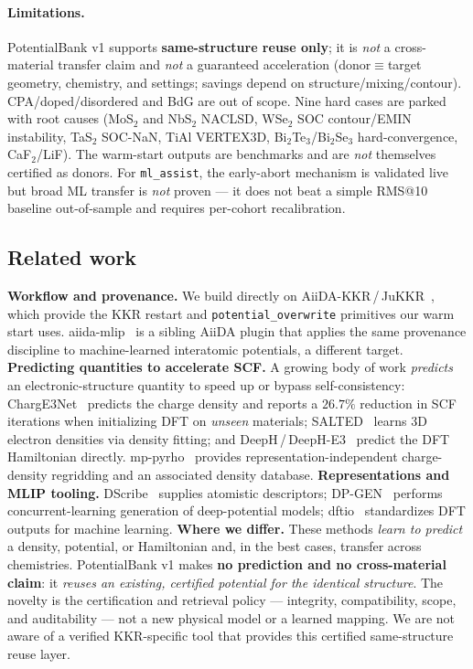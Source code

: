 \documentclass[11pt]{article}
\newcommand{\code}[1]{\texttt{#1}}
\begin{document}
\paragraph{Limitations.} PotentialBank v1 supports \textbf{same-structure reuse only}; it is \emph{not} a
cross-material transfer claim and \emph{not} a guaranteed acceleration (donor$\equiv$target geometry,
chemistry, and settings; savings depend on structure/mixing/contour). CPA/doped/disordered and BdG are out of
scope. Nine hard cases are parked with root causes (MoS$_2$ and NbS$_2$ NACLSD, WSe$_2$ SOC contour/EMIN
instability, TaS$_2$ SOC-NaN, TiAl VERTEX3D, Bi$_2$Te$_3$/Bi$_2$Se$_3$ hard-convergence, CaF$_2$/LiF). The
warm-start outputs are benchmarks and are \emph{not} themselves certified as donors. For \code{ml\_assist}, the
early-abort mechanism is validated live but broad ML transfer is \emph{not} proven --- it does not beat a
simple RMS@10 baseline out-of-sample and requires per-cohort recalibration.

\subsection{Related work}
\label{sec:relatedwork}
\textbf{Workflow and provenance.} We build directly on AiiDA-KKR\,/\,JuKKR~\cite{aiidakkr}, which provide the
KKR restart and \code{potential\_overwrite} primitives our warm start uses. aiida-mlip~\cite{aiidamlip} is a
sibling AiiDA plugin that applies the same provenance discipline to machine-learned interatomic potentials, a
different target. \textbf{Predicting quantities to accelerate SCF.} A growing body of work \emph{predicts} an
electronic-structure quantity to speed up or bypass self-consistency: ChargE3Net~\cite{charge3net} predicts the
charge density and reports a $26.7\%$ reduction in SCF iterations when initializing DFT on \emph{unseen}
materials; SALTED~\cite{salted} learns 3D electron densities via density fitting; and
DeepH\,/\,DeepH-E3~\cite{deeph,deephe3} predict the DFT Hamiltonian directly. mp-pyrho~\cite{pyrho} provides
representation-independent charge-density regridding and an associated density database. \textbf{Representations
and MLIP tooling.} DScribe~\cite{dscribe} supplies atomistic descriptors; DP-GEN~\cite{dpgen} performs
concurrent-learning generation of deep-potential models; dftio~\cite{dftio} standardizes DFT outputs for machine
learning. \textbf{Where we differ.} These methods \emph{learn to predict} a density, potential, or Hamiltonian
and, in the best cases, transfer across chemistries. PotentialBank v1 makes \textbf{no prediction and no
cross-material claim}: it \emph{reuses an existing, certified potential for the identical structure}. The
novelty is the certification and retrieval policy --- integrity, compatibility, scope, and auditability --- not
a new physical model or a learned mapping. We are not aware of a verified KKR-specific tool that provides this
certified same-structure reuse layer.
\end{document}
